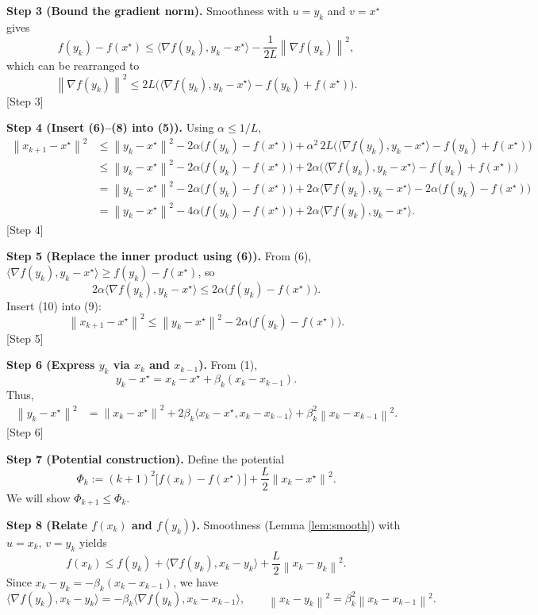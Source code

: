 \documentclass{article}
\newcommand{\norm}[1]{\left\lVert#1\right\rVert}
\begin{document}
\noindent\textbf{Step 3 (Bound the gradient norm).}  
Smoothness with $u=y_k$ and $v=x^{\star}$ gives
\[
f(y_k)-f(x^{\star})\le\langle\nabla f(y_k),y_k-x^{\star}\rangle
-\frac{1}{2L}\norm{\nabla f(y_k)}^{2}, \tag{7}
\]
which can be rearranged to
\[
\norm{\nabla f(y_k)}^{2}\le 2L\bigl(\langle\nabla f(y_k),y_k-x^{\star}\rangle-
f(y_k)+f(x^{\star})\bigr). \tag{8}
\]
[Step 3]

\noindent\textbf{Step 4 (Insert (6)–(8) into (5)).}  
Using $\alpha\le 1/L$,
\begin{align}
\norm{x_{k+1}-x^{\star}}^{2}
&\le \norm{y_k-x^{\star}}^{2}
-2\alpha\bigl(f(y_k)-f(x^{\star})\bigr)
+\alpha^{2}\,2L\bigl(\langle\nabla f(y_k),y_k-x^{\star}\rangle-
f(y_k)+f(x^{\star})\bigr) \nonumber\\
&\le \norm{y_k-x^{\star}}^{2}
-2\alpha\bigl(f(y_k)-f(x^{\star})\bigr)
+2\alpha\bigl(\langle\nabla f(y_k),y_k-x^{\star}\rangle-
f(y_k)+f(x^{\star})\bigr) \nonumber\\
&= \norm{y_k-x^{\star}}^{2}
-2\alpha\bigl(f(y_k)-f(x^{\star})\bigr)
+2\alpha\langle\nabla f(y_k),y_k-x^{\star}\rangle
-2\alpha\bigl(f(y_k)-f(x^{\star})\bigr) \nonumber\\
&= \norm{y_k-x^{\star}}^{2}
-4\alpha\bigl(f(y_k)-f(x^{\star})\bigr)
+2\alpha\langle\nabla f(y_k),y_k-x^{\star}\rangle . \tag{9}
\end{align}
[Step 4]

\noindent\textbf{Step 5 (Replace the inner product using (6)).}  
From (6), $\langle\nabla f(y_k),y_k-x^{\star}\rangle\ge f(y_k)-f(x^{\star})$, so
\[
2\alpha\langle\nabla f(y_k),y_k-x^{\star}\rangle
\le 2\alpha\bigl(f(y_k)-f(x^{\star})\bigr). \tag{10}
\]
Insert (10) into (9):
\[
\norm{x_{k+1}-x^{\star}}^{2}
\le \norm{y_k-x^{\star}}^{2}
-2\alpha\bigl(f(y_k)-f(x^{\star})\bigr). \tag{11}
\]
[Step 5]

\noindent\textbf{Step 6 (Express $y_k$ via $x_k$ and $x_{k-1}$).}  
From (1),
\[
y_k - x^{\star}= x_k-x^{\star}+ \beta_k (x_k-x_{k-1}). \tag{12}
\]
Thus,
\begin{align}
\norm{y_k-x^{\star}}^{2}
&= \norm{x_k-x^{\star}}^{2}
+2\beta_k\langle x_k-x^{\star},x_k-x_{k-1}\rangle
+\beta_k^{2}\norm{x_k-x_{k-1}}^{2}. \tag{13}
\end{align}
[Step 6]

\noindent\textbf{Step 7 (Potential construction).}  
Define the potential
\[
\Phi_k := (k+1)^2\bigl[f(x_k)-f(x^{\star})\bigr]
+\frac{L}{2}\norm{x_k-x^{\star}}^{2}. \tag{14}
\]
We will show $\Phi_{k+1}\le\Phi_k$.

\noindent\textbf{Step 8 (Relate $f(x_k)$ and $f(y_k)$).}  
Smoothness (Lemma \ref{lem:smooth}) with $u=x_k$, $v=y_k$ yields
\[
f(x_k)\le f(y_k)+\langle\nabla f(y_k),x_k-y_k\rangle
+\frac{L}{2}\norm{x_k-y_k}^{2}. \tag{15}
\]
Since $x_k-y_k=-\beta_k(x_k-x_{k-1})$, we have
\[
\langle\nabla f(y_k),x_k-y_k\rangle
= -\beta_k\langle\nabla f(y_k),x_k-x_{k-1}\rangle,
\qquad
\norm{x_k-y_k}^{2}= \beta_k^{2}\norm{x_k-x_{k-1}}^{2}. \tag{16}
\]
\end{document}
